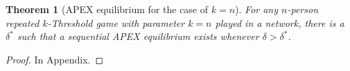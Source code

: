 \documentclass[12pt,letter]{article}
\newtheorem{theorem}{Theorem}
\theoremstyle{definition}
\theoremstyle{remark}
\theoremstyle{claim}
\begin{document}
\begin{theorem}[APEX equilibrium for the case of $k=n$]
\label{thm_minor_thm}
For any $n$-person repeated $k$-Threshold game with parameter $k=n$ played in a network, there is a $\delta^{*}$ such that a sequential APEX equilibrium exists whenever $\delta>
\delta^{*}$.
\end{theorem}
\begin{proof}
In Appendix.
\end{proof}
%
%
%
%
\end{document}
